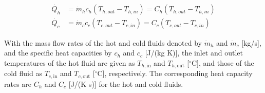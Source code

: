 \begin{align}
    \dot{Q_h} &= \dot{m}_hc_h(T_{h,out} - T_{h,in}) = C_h (T_{h,out} - T_{h,in}) \\  
    \dot{Q_c} &= \dot{m}_cc_c(T_{c,out} - T_{c,in}) = C_c (T_{c,out} - T_{c,in})
\end{align}

With the mass flow rates of the hot and cold fluids denoted by \( \dot{m}_h \) and \( \dot{m}_c \) [kg/s], and the specific heat capacities by \( c_h \) and \( c_c \) [J/(kg K)], the inlet and outlet temperatures of the hot fluid are given as \( T_{h,\text{in}} \) and \( T_{h,\text{out}} \) [\( ^\circ \)C], and those of the cold fluid as \( T_{c,\text{in}} \) and \( T_{c,\text{out}} \) [\( ^\circ \)C], respectively. The corresponding heat capacity rates are \( C_h \) and \( C_c \) [J/(K s)] for the hot and cold fluids.


